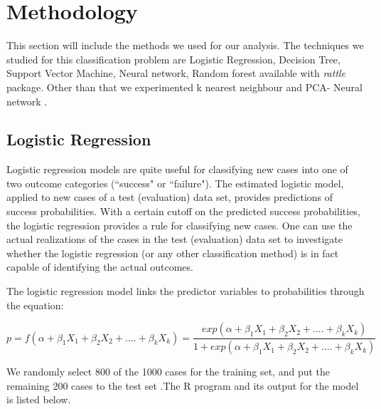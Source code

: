 \documentclass{article}\usepackage[]{graphicx}\usepackage[]{color}
\begin{document}
\section{Methodology} This section will include the methods we used for our analysis. The techniques we studied for this classification problem are Logistic Regression, Decision Tree, Support Vector Machine, Neural network, Random forest  available with \textit{rattle} package.  Other than that we experimented k nearest neighbour and PCA- Neural network .

\subsection{Logistic Regression} \hspace{0.9cm}Logistic regression models are quite useful for classifying new cases into one of two outcome categories (``success" or ``failure"). The estimated logistic model, applied to new cases of a test (evaluation) data set, provides predictions of success probabilities. With a certain cutoff on the predicted success probabilities, the logistic regression provides a rule for classifying new cases. One can use the actual realizations of the cases in the test (evaluation) data set to investigate whether the logistic regression (or any other classification method) is in fact capable of identifying the
actual outcomes. 
\par \hspace{0.5}The logistic regression model links the predictor variables to probabilities
through the equation:

\begin{equation} \label{eq:reg}
 p = f(\alpha + \beta_1 X_1 + \beta_2 X_2 + ....+ \beta_k X_k ) = \frac{exp(\alpha + \beta_1 X_1 + \beta_2 X_2 + ....+ \beta_k X_k )}{1+exp(\alpha + \beta_1 X_1 + \beta_2 X_2 + ....+ \beta_k X_k ) }
\end{equation}
 

We randomly select 800 of the 1000 cases for the training set, and put the remaining 200 cases to the test set .The R program and its output for the model is listed below.
\end{document}
